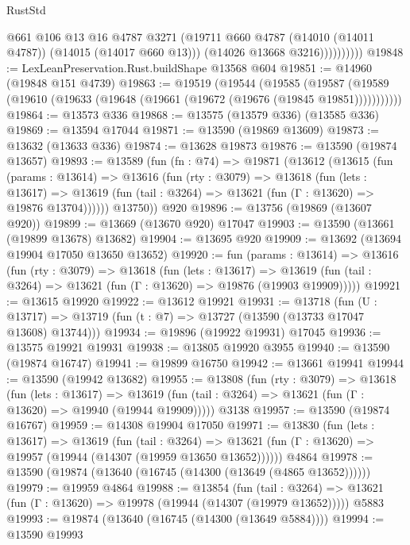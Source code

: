 \begin{lexlean}{RustStd}
\begin{coremodule}
                      @661
                      @106
                      @13
                      @16
                      @4787
                      @3271
                      (@19711 @660 @4787 (@14010 (@14011 @4787)) (@14015 (@14017 @660 @13)))
                      (@14026 @13668 @3216))))))))))
@19848 := LexLeanPreservation.Rust.buildShape @13568 @604
@19851 := @14960 (@19848 @151 @4739)
@19863 := @19519
    (@19544
      (@19585
        (@19587 (@19589 (@19610 (@19633 (@19648 (@19661 (@19672 (@19676 (@19845 @19851)))))))))))
@19864 := @13573 @336
@19868 := @13575 (@13579 @336) (@13585 @336)
@19869 := @13594 @17044
@19871 := @13590 (@19869 @13609)
@19873 := @13632 (@13633 @336)
@19874 := @13628 @19873
@19876 := @13590 (@19874 @13657)
@19893 := @13589
    (fun (fn : @74) =>
    @19871
      (@13612
        (@13615
          (fun (params : @13614) =>
          @13616
            (fun (rty : @3079) =>
            @13618
              (fun (lets : @13617) =>
              @13619 (fun (tail : @3264) => @13621 (fun (Γ : @13620) => @19876 @13704))))))
        @13750))
    @920
@19896 := @13756 (@19869 (@13607 @920))
@19899 := @13669 (@13670 @920) @17047
@19903 := @13590 (@13661 (@19899 @13678) @13682)
@19904 := @13695 @920
@19909 := @13692 (@13694 @19904 @17050 @13650 @13652)
@19920 := fun (params : @13614) =>
  @13616
    (fun (rty : @3079) =>
    @13618
      (fun (lets : @13617) =>
      @13619 (fun (tail : @3264) => @13621 (fun (Γ : @13620) => @19876 (@19903 @19909)))))
@19921 := @13615 @19920
@19922 := @13612 @19921
@19931 := @13718
    (fun (U : @13717) => @13719 (fun (t : @7) => @13727 (@13590 (@13733 @17047 @13608) @13744)))
@19934 := @19896 (@19922 @19931) @17045
@19936 := @13575 @19921 @19931
@19938 := @13805 @19920 @3955
@19940 := @13590 (@19874 @16747)
@19941 := @19899 @16750
@19942 := @13661 @19941
@19944 := @13590 (@19942 @13682)
@19955 := @13808
    (fun (rty : @3079) =>
    @13618
      (fun (lets : @13617) =>
      @13619 (fun (tail : @3264) => @13621 (fun (Γ : @13620) => @19940 (@19944 @19909)))))
    @3138
@19957 := @13590 (@19874 @16767)
@19959 := @14308 @19904 @17050
@19971 := @13830
    (fun (lets : @13617) =>
    @13619
      (fun (tail : @3264) =>
      @13621 (fun (Γ : @13620) => @19957 (@19944 (@14307 (@19959 @13650 @13652))))))
    @4864
@19978 := @13590 (@19874 (@13640 (@16745 (@14300 (@13649 (@4865 @13652))))))
@19979 := @19959 @4864
@19988 := @13854
    (fun (tail : @3264) => @13621 (fun (Γ : @13620) => @19978 (@19944 (@14307 (@19979 @13652)))))
    @5883
@19993 := @19874 (@13640 (@16745 (@14300 (@13649 @5884))))
@19994 := @13590 @19993

\end{coremodule}
\end{lexlean}
